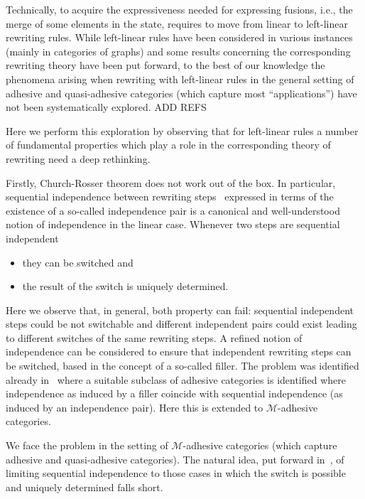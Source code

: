 \documentclass[a4paper,UKenglish,cleveref,pdftex, thm-restate,numberwithinsect]{lipics}
\begin{document}

Technically, to acquire the expressiveness needed for expressing
fusions, i.e., the merge of some elements in the state, requires to
move from linear to left-linear rewriting rules. While left-linear
rules have been considered in various instances (mainly in categories
of graphs) and some results concerning the corresponding rewriting
theory have been put forward, to the best of our knowledge the
phenomena arising when rewriting with left-linear rules in the general
setting of adhesive and quasi-adhesive categories (which capture most
``applications'') have not been systematically explored. ADD REFS

Here we perform this exploration by observing that for left-linear
rules a number of fundamental properties which play a role in the
corresponding theory of rewriting need a deep rethinking.

Firstly, Church-Rosser theorem does not work out of the box. In
particular, sequential independence between rewriting steps~\cite{}
expressed in terms of the existence of a so-called independence pair
is a canonical and well-understood notion of independence in the
linear case.  Whenever two steps are sequential independent
\begin{itemize}
\item they can be switched and 
\item the result of the switch is uniquely determined.
\end{itemize}

Here we observe that, in general, both property can fail: sequential
independent steps could be not switchable and different independent
pairs could exist leading to different switches of the same rewriting
steps.  A refined notion of independence can be considered to ensure
that independent rewriting steps can be switched, based in the concept
of a so-called filler. The problem was identified already
in~\cite{baldan2011adhesivity} where a suitable subclass of adhesive
categories is identified where independence as induced by a filler
coincide with sequential independence (as induced by an independence
pair). Here this is extended to $\mathcal{M}$-adhesive categories.


We face the problem in the setting of $\mathcal{M}$-adhesive
categories (which capture adhesive and quasi-adhesive categories).
The natural idea, put forward in~\cite{baldan2017domains}, of limiting
sequential independence to those cases in which the switch is possible
and uniquely determined falls short.
\end{document}
